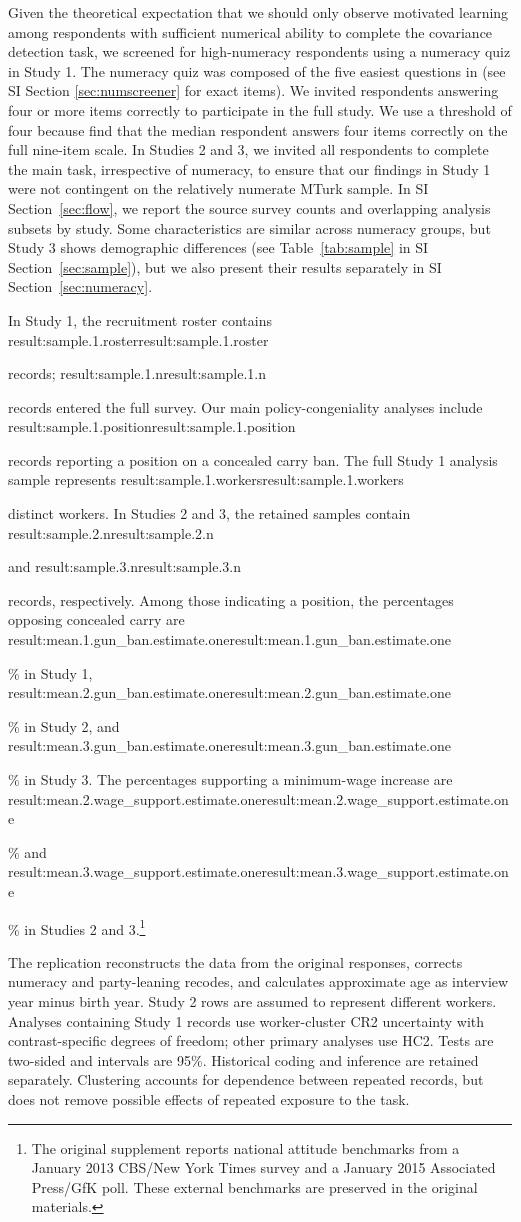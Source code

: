 \documentclass[12pt,letterpaper]{article}
\newcommand{\result}[1]{\ifcsname result:#1\endcsname\csname result:#1\endcsname\else\PackageError{replication}{Missing result #1}{}\fi}
\begin{document}
Given the theoretical expectation that we should only observe motivated learning among respondents with sufficient numerical ability to complete the covariance detection task, we screened for high-numeracy respondents using a numeracy quiz in Study 1. The numeracy quiz was composed of the five easiest questions in \citet{weller2012} (see SI Section \ref{sec:numscreener} for exact items). We invited respondents answering four or more items correctly to participate in the full study. We use a threshold of four because \citet{kahan2017} find that the median respondent answers four items correctly on the full nine-item scale. In Studies 2 and 3, we invited all respondents to complete the main task, irrespective of numeracy, to ensure that our findings in Study 1 were not contingent on the relatively numerate MTurk sample.
In SI Section~\ref{sec:flow}, we report the source survey counts and overlapping analysis subsets by study.
Some characteristics are similar across numeracy groups, but Study 3 shows demographic differences (see Table~\ref{tab:sample} in SI Section~\ref{sec:sample}), but we also present their results separately in SI Section~\ref{sec:numeracy}.

In Study 1, the recruitment roster contains \result{sample.1.roster} records; \result{sample.1.n} records entered the full survey. Our main policy-congeniality analyses include \result{sample.1.position} records reporting a position on a concealed carry ban. The full Study 1 analysis sample represents \result{sample.1.workers} distinct workers. In Studies 2 and 3, the retained samples contain \result{sample.2.n} and \result{sample.3.n} records, respectively. Among those indicating a position, the percentages opposing concealed carry are \result{mean.1.gun_ban.estimate.one}\% in Study 1, \result{mean.2.gun_ban.estimate.one}\% in Study 2, and \result{mean.3.gun_ban.estimate.one}\% in Study 3. The percentages supporting a minimum-wage increase are \result{mean.2.wage_support.estimate.one}\% and \result{mean.3.wage_support.estimate.one}\% in Studies 2 and 3.\footnote{The original supplement reports national attitude benchmarks from a January 2013 CBS/New York Times survey and a January 2015 Associated Press/GfK poll. These external benchmarks are preserved in the original materials.}

The replication reconstructs the data from the original responses, corrects numeracy and party-leaning recodes, and calculates approximate age as interview year minus birth year. Study 2 rows are assumed to represent different workers. Analyses containing Study 1 records use worker-cluster CR2 uncertainty with contrast-specific degrees of freedom; other primary analyses use HC2. Tests are two-sided and intervals are 95\%. Historical coding and inference are retained separately. Clustering accounts for dependence between repeated records, but does not remove possible effects of repeated exposure to the task.
\end{document}
